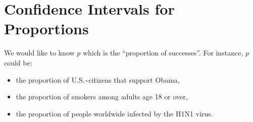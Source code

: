 \documentclass[captions=tableheading]{scrbook}
\begin{document}
\section{Confidence Intervals for Proportions}
\label{sec-9-4}

\label{sec:Confidence-Intervals-Proportions}

We would like to know \(p\) which is the ``proportion of successes''. For instance, \(p\) could be:
\begin{itemize}
\item the proportion of U.S.\~{}citizens that support Obama,
\item the proportion of smokers among adults age 18 or over,
\item the proportion of people worldwide infected by the H1N1 virus.
\end{itemize}
\end{document}
